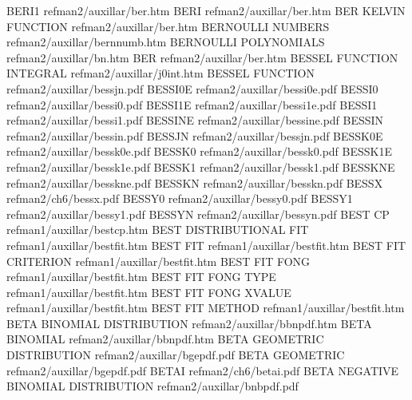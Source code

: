 BERI1                                   refman2/auxillar/ber.htm
BERI                                    refman2/auxillar/ber.htm
BER KELVIN FUNCTION                     refman2/auxillar/ber.htm
BERNOULLI NUMBERS                       refman2/auxillar/bernnumb.htm
BERNOULLI POLYNOMIALS                   refman2/auxillar/bn.htm
BER                                     refman2/auxillar/ber.htm
BESSEL FUNCTION INTEGRAL                refman2/auxillar/j0int.htm
BESSEL FUNCTION                         refman2/auxillar/bessjn.pdf
BESSI0E                                 refman2/auxillar/bessi0e.pdf
BESSI0                                  refman2/auxillar/bessi0.pdf
BESSI1E                                 refman2/auxillar/bessi1e.pdf
BESSI1                                  refman2/auxillar/bessi1.pdf
BESSINE                                 refman2/auxillar/bessine.pdf
BESSIN                                  refman2/auxillar/bessin.pdf
BESSJN                                  refman2/auxillar/bessjn.pdf
BESSK0E                                 refman2/auxillar/bessk0e.pdf
BESSK0                                  refman2/auxillar/bessk0.pdf
BESSK1E                                 refman2/auxillar/bessk1e.pdf
BESSK1                                  refman2/auxillar/bessk1.pdf
BESSKNE                                 refman2/auxillar/besskne.pdf
BESSKN                                  refman2/auxillar/besskn.pdf
BESSX                                   refman2/ch6/bessx.pdf
BESSY0                                  refman2/auxillar/bessy0.pdf
BESSY1                                  refman2/auxillar/bessy1.pdf
BESSYN                                  refman2/auxillar/bessyn.pdf
BEST CP                                 refman1/auxillar/bestcp.htm
BEST DISTRIBUTIONAL FIT                 refman1/auxillar/bestfit.htm
BEST FIT                                refman1/auxillar/bestfit.htm
BEST FIT CRITERION                      refman1/auxillar/bestfit.htm
BEST FIT FONG                           refman1/auxillar/bestfit.htm
BEST FIT FONG TYPE                      refman1/auxillar/bestfit.htm
BEST FIT FONG XVALUE                    refman1/auxillar/bestfit.htm
BEST FIT METHOD                         refman1/auxillar/bestfit.htm
BETA BINOMIAL DISTRIBUTION              refman2/auxillar/bbnpdf.htm
BETA BINOMIAL                           refman2/auxillar/bbnpdf.htm
BETA GEOMETRIC DISTRIBUTION             refman2/auxillar/bgepdf.pdf
BETA GEOMETRIC                          refman2/auxillar/bgepdf.pdf
BETAI                                   refman2/ch6/betai.pdf
BETA NEGATIVE BINOMIAL DISTRIBUTION     refman2/auxillar/bnbpdf.pdf
